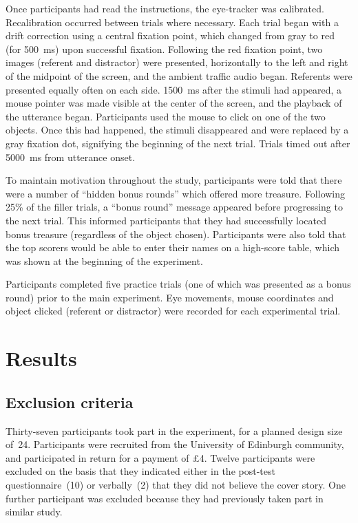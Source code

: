 \documentclass[a4paper,man,natbib]{apa6}
\begin{document}
Once participants had read the instructions, the eye-tracker was calibrated.
Recalibration occurred between trials where necessary.
Each trial began with a drift correction using a central fixation point, which changed from gray to red (for 500~ms) upon successful fixation. 
Following the red fixation point, two images (referent and distractor) were presented, horizontally to the left and right of the midpoint of the screen, and the ambient traffic audio began.
Referents were presented equally often on each side.
1500~ms after the stimuli had appeared, a mouse pointer was made visible at the center of the screen, and the playback of the utterance began.
Participants used the mouse to click on one of the two objects.
Once this had happened, the stimuli disappeared and were replaced by a gray fixation dot, signifying the beginning of the next trial. 
Trials timed out after 5000~ms from utterance onset.


To maintain motivation throughout the study, participants were told that there were a number of ``hidden bonus rounds'' which offered more treasure. 
Following 25\% of the filler trials, a ``bonus round'' message appeared before progressing to the next trial.
This informed participants that they had successfully located bonus treasure (regardless of the object chosen).
Participants were also told that the top scorers would be able to enter their names on a high-score table, which was shown at the beginning of the experiment. 

Participants completed five practice trials (one of which was presented as a bonus round) prior to the main experiment. 
Eye movements, mouse coordinates and object clicked (referent or distractor) were recorded for each experimental trial.


\section{Results}
\subsection{Exclusion criteria}
Thirty-seven participants took part in the experiment, for a planned design size of~24.
Participants were recruited from the University of Edinburgh community, and participated in return for a payment of \pounds{}4.
Twelve participants were excluded on the basis that they indicated either in the post-test questionnaire~(10) or verbally~(2) that they did not believe the cover story.
One further participant was excluded because they had previously taken part in similar study.
\end{document}
